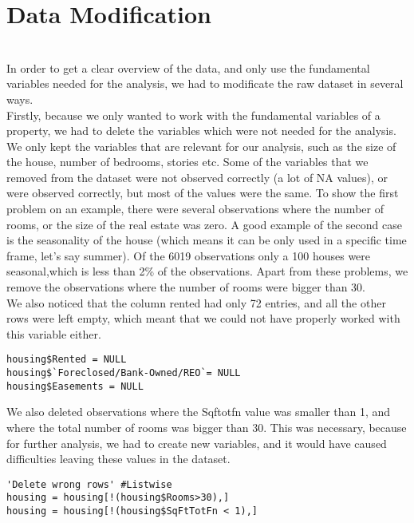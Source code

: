 

\section{Data Modification}\label{Sec:Modification}
\\
In order to get a clear overview of the data, and only use the fundamental variables needed for the analysis, we had to modificate the raw dataset in several ways. \\

Firstly, because we only wanted to work with the fundamental variables of a property,  we had to delete the variables which were not needed for the analysis. We only kept the variables that are relevant for our analysis, such as the size of the house, number of bedrooms, stories etc. Some of the variables that we removed from the dataset were not observed correctly (a lot of NA values), or were observed correctly, but most of the values were the same. To show the first problem on an example, there were several observations where the number of rooms, or the size of the real estate was zero.  A good example of the second case is the seasonality of the house (which means it can be only used in a specific time frame, let's say summer). Of the 6019 observations only a 100 houses were seasonal,which is less than 2\% of the observations. Apart from these problems, we remove the observations where the number of rooms were bigger than 30.\\
We also noticed that the column rented had only 72 entries, and all the other rows were left empty, which meant that we could not have properly worked with this variable either. \\

\begin{lstlisting}[frame = single,backgroundcolor=\color{hellgelb}]
housing$Rented = NULL
housing$`Foreclosed/Bank-Owned/REO`= NULL
housing$Easements = NULL
\end{lstlisting}


We also deleted observations where the Sqftotfn value was smaller than 1, and where the total number of rooms was bigger than 30. This was necessary, because for further analysis, we had to create new variables, and it would have caused difficulties leaving these values in the dataset.\\

\begin{lstlisting}[frame = single,backgroundcolor=\color{hellgelb}]
'Delete wrong rows' #Listwise
housing = housing[!(housing$Rooms>30),]
housing = housing[!(housing$SqFtTotFn < 1),]
\end{lstlisting}

